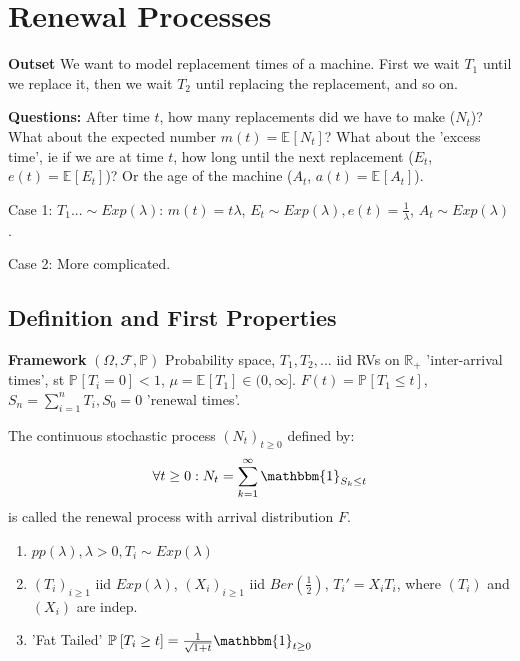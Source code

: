 \chapter{Renewal Processes}
\textbf{Outset} We want to model replacement times of a machine. First we wait $T_1$ until we replace it, then we wait $T_2$ until replacing the replacement, and so on.

\noindent
\textbf{Questions:} After time $t$, how many replacements did we have to make ($N_t$)? What about the expected number $m(t)=\mathbb{E}_{} \left[ N_t \right] $?
What about the 'excess time', ie if we are at time $t$, how long until the next replacement ($E_t$, $e(t)=\mathbb{E}_{} \left[ E_t \right]$)? Or the age of the machine ($A_t$, $a(t)=\mathbb{E}_{} \left[ A_t \right] $).

Case 1: $T_1... \sim Exp(\lambda)$: $m(t)=t\lambda$, $E_t \sim Exp(\lambda), e(t)= \frac{1}{\lambda}$, $A_t \sim Exp(\lambda)$.

Case 2: More complicated.

\section{Definition and First Properties}
\textbf{Framework} $(\Omega, \mathcal{F}, \mathbb{P})$ Probability space, $T_1, T_2,...$ iid RVs on $\mathbb{R}_+$ 'inter-arrival times', st $\mathbb{P}_{} \left[ T_i = 0 \right] < 1$, $\mu = \mathbb{E}_{} \left[ T_1 \right] \in (0, \infty]$. $F(t) =  \mathbb{P}_{} \left[ T_1 \leq t \right] $, $S_n = \sum_{i=1}^{n} T_i, S_0 =0$ 'renewal times'.
\begin{defn}
	The continuous stochastic process $(N_t)_{t\geq 0}$ defined by:
\begin{align}
	\forall t \geq 0: N_t = \sum_{k=1}^{\infty} \mathbbm{1}_{S_k \leq t}
\end{align}
is called the renewal process with arrival distribution $F$.
\end{defn}

\begin{ex}[]
	\begin{enumerate}
		\item $pp(\lambda ), \lambda> 0, T_i \sim Exp(\lambda)$
		\item $(T_i)_{i\geq 1}$ iid $Exp(\lambda)$, $(X_i)_{i\geq 1}$ iid $Ber(\frac{1}{2})$, $T_i'= X_i T_i$, where  $(T_i)$ and  $(X_i)$ are indep.
		\item 'Fat Tailed' $\mathbb{P}_{} \left[ T_{i} \geq t \right] = \frac{1}{\sqrt{1+t}} \mathbbm{1}_{t\geq 0}$
	\end{enumerate}
	
\end{ex}

